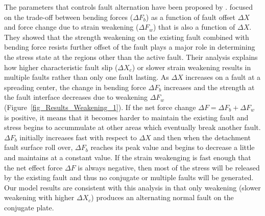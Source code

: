 The parameters that controls fault alternation have been proposed by \citet{Lavier2000}. \citet{Lavier2000} focused on the trade-off between bending forces ($\Delta F_{b}$) as a function of fault offset $\Delta X$ and force change due to strain weakening ($\Delta F_{w}$) that is also a function of  $\Delta X$. They showed that the strength weakening on the existing fault combined with bending force resists further offset of the fault plays a major role in determining the stress state at the regions other than the active fault. Their analysis explains how higher characteristic fault slip ($\Delta X_{c}$) or slower strain weakening results in multiple faults rather than only one fault lasting. %
 As $\Delta X$ increases on a fault at a spreading center, the change in bending force $\Delta F_{b}$ increases and the strength at the fault interface decreases due to weakening $\Delta F_{w}$ (Figure~\hyperref[fig_Results_Weakening_1]{\ref{fig_Results_Weakening_1}}). If the net force change $\Delta F = \Delta F_{b}+ \Delta F_{w}$ is positive, it means that it becomes harder to maintain the existing fault and stress begins to accummulate at other areas which eventually break another fault. $\Delta F_{b}$ initially increases fast with respect to $\Delta X$ and then when the detachment fault surface roll over, $\Delta F_{b}$ reaches its peak value and begins to decrease a little and maintains at a constant value. If the strain weakenging is fast enough that the net effect force $\Delta F$ is always negative, then most of the stress will be released by the existing fault and thus no conjugate or multiple faults will be generated. 
Our model results are consistent with this analysis in that only weakening (slower weakening with higher $\Delta X_{c}$) produces an alternating normal fault on the conjugate plate.


